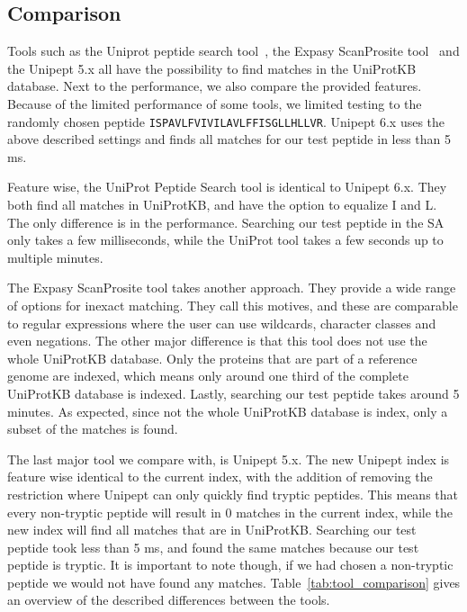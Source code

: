\documentclass[11pt]{article}
\begin{document}
\begin{multicols}{2}
        \section{Comparison}\label{sec:comparison}
        Tools such as the Uniprot peptide search tool~\cite{uniprot_search_site, uniprot_search_paper}, the Expasy ScanProsite tool~\cite{scanprosite} and the Unipept 5.x all have the possibility to find matches in the UniProtKB database.
        Next to the performance, we also compare the provided features.
        Because of the limited performance of some tools, we limited testing to the randomly chosen peptide \texttt{ISPAVLFVIVILAVLFFISGLLHLLVR}.
        Unipept 6.x uses the above described settings and finds all matches for our test peptide in less than 5 ms.

        Feature wise, the UniProt Peptide Search tool is identical to Unipept 6.x.
        They both find all matches in UniProtKB, and have the option to equalize I and L\@.
        The only difference is in the performance.
        Searching our test peptide in the SA only takes a few milliseconds, while the UniProt tool takes a few seconds up to multiple minutes.

        The Expasy ScanProsite tool takes another approach.
        They provide a wide range of options for inexact matching.
        They call this motives, and these are comparable to regular expressions where the user can use wildcards, character classes and even negations.
        The other major difference is that this tool does not use the whole UniProtKB database.
        Only the proteins that are part of a reference genome are indexed, which means only around one third of the complete UniProtKB database is indexed.
        Lastly, searching our test peptide takes around 5 minutes.
        As expected, since not the whole UniProtKB database is index, only a subset of the matches is found.

        The last major tool we compare with, is Unipept 5.x.
        The new Unipept index is feature wise identical to the current index, with the addition of removing the restriction where Unipept can only quickly find tryptic peptides.
        This means that every non-tryptic peptide will result in 0 matches in the current index, while the new index will find all matches that are in UniProtKB\@.
        Searching our test peptide took less than 5 ms, and found the same matches because our test peptide is tryptic.
        It is important to note though, if we had chosen a non-tryptic peptide we would not have found any matches.
        Table~\ref{tab:tool_comparison} gives an overview of the described differences between the tools.


\end{multicols}
\end{document}
